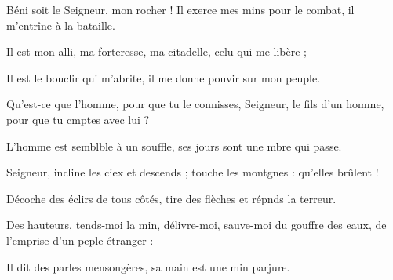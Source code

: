 \item Béni soit le Seigneur, mon rocher !\pscross{} Il exerce mes mins pour le combat,\psstar{} il m’entrîne à la bataille.
\item Il est mon alli, ma forteresse,\psstar{} ma citadelle, celu qui me libère ; 
\item Il est le bouclir qui m’abrite,\psstar{} il me donne pouvir sur mon peuple.
\item Qu’est-ce que l’homme, pour que tu le connisses, Seigneur,\psstar{} le fils d’un homme, pour que tu cmptes avec lui ?
\item L’homme est semblble à un souffle,\psstar{} ses jours sont une mbre qui passe.
\item Seigneur, incline les ciex et descends ;\psstar{} touche les montgnes : qu’elles brûlent !
\item Décoche des éclirs de tous côtés,\psstar{} tire des flèches et répnds la terreur.
\item Des hauteurs, tends-moi la min, délivre-moi,\psstar{} sauve-moi du gouffre des eaux, de l’emprise d’un peple étranger :
\item Il dit des parles mensongères,\psstar{} sa main est une min parjure.
